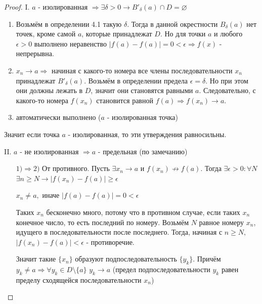 	\begin{proof}
		I. $a$ - изолированная $\Rightarrow \exists \delta > 0 \rightarrow B'_{\delta}(a) \cap D = \varnothing$
		\begin{enumerate}
			\item Возьмём в определении 4.1 такую $\delta$. Тогда в данной окрестности $B_{\delta}(a)$ нет точек, кроме самой $a$, которые принадлежат $D$. Но для точки $a$ и любого $\epsilon > 0$ выполнено неравенство $|f(a) - f(a)| = 0 < \epsilon \Rightarrow f(x)$ - непрерывна.
			\item $x_n \to a \Rightarrow$ начиная с какого-то номера все члены последовательности $x_n$ принадлежат $B'_{\delta}(a)$. Возьмём в определении предела $\epsilon = \delta$. Но при этом они должны лежать в $D$, значит они становятся равными $a$. Следовательно, с какого-то номера $f(x_n)$ становится равной $f(a) \Rightarrow f(x_n) \to a.$
			\item автоматически выполнено ($a$ - изолированная точка)
		\end{enumerate}
		Значит если точка $a$ - изолированная, то эти утверждения равносильны.
		
		II. $a$ - не изолированная $\Rightarrow a$ - предельная (по замечанию)
		\begin{itemize}
			\item[$1) \Rightarrow 2)$] От противного. Пусть $\exists x_n \to a$ и $f(x_n) \not\to f(a)$. Тогда $\exists \epsilon > 0: \forall N$ $\exists n \geqslant N \rightarrow |f(x_n) - f(a)| \geqslant \epsilon$
			
			$x_n \neq a,$ иначе $|f(a) - f(a)| = 0 < \epsilon$
			
			Таких $x_n$ бесконечно много, потому что в противном случае, если таких $x_n$ конечное число, то есть последний по номеру. Возьмём $N$ равное номеру $x_n$, идущего в последовательности после последнего. Тогда, начиная с $n \geqslant N,$ $|f(x_n) - f(a)| < \epsilon$ - противоречие.
			
			Значит такие $\{x_n\}$ образуют подпоследовательность $\{y_k\}$. Причём $y_k \neq a \Rightarrow \forall y_k \in D \setminus \{a\}$ $y_k \to a$ (предел подпоследовательности $y_k$ равен пределу сходящейся последовательности $x_n$)
			

\end{itemize}
\end{proof}
